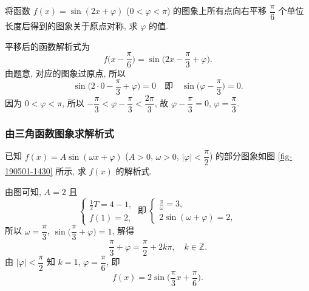 \begin{exercise}
    将函数 $f(x)=\sin(2x+\varphi)$ ($0<\varphi<\pi$) 的图象上所有点向右平移 $\dfrac\pi6$ 个单位长度后得到的图象关于原点对称, 求 $\varphi$ 的值.
\end{exercise}
\beginsolution
    平移后的函数解析式为
    \[f\biggl(x- \frac\pi6\biggr)= \sin\biggl(2x-\frac\pi3+\varphi\biggr).\]
    由题意, 对应的图象过原点, 所以
    \[\sin\biggl(2\cdot 0-\frac\pi3+\varphi\biggr)=0\quad
        \text{即}\quad\sin\biggl(\varphi- \frac\pi3\biggr)=0.\]
    因为 $0<\varphi<\pi$, 所以 $-\dfrac\pi3< \varphi-\dfrac\pi3< \dfrac{2\pi}3$, 故 $\varphi- \dfrac\pi3=0$, $\varphi= \dfrac\pi3$.
\endsolution

\subsubsection{由三角函数图象求解析式}

\begin{example}
    已知 $f(x)=A\sin(\omega x+\varphi)$ ($A>0$, $\omega>0$, $|\varphi|< \dfrac\pi2$) 的部分图象如图 \ref{fig-190501-1430} 所示, 求 $f(x)$ 的解析式.
\end{example}
\beginsolution
    由图可知, $A=2$ 且
    \[\left\{\!\!\begin{array}{l}
        \frac12 T= 4-1,\\
        f(1)=2,
    \end{array}\right.\ \text{即}\ 
    \left\{\!\!\begin{array}{l}
        \frac\pi\omega= 3,\\
        2\sin(\omega+\varphi)= 2,
    \end{array}\right.\]
    所以 $\omega= \dfrac\pi3$, $\sin\biggl(\dfrac\pi3+ \varphi\biggr)= 1$, 解得
    \[\frac\pi3+\varphi= \frac\pi2+2k\pi,\quad k\in\mathbb{Z}.\]
    由 $|\varphi|< \dfrac\pi2$ 知 $k=1$, $\varphi= \dfrac\pi6$, 即
    \[f(x)= 2\sin\biggl(\frac\pi3 x+ \frac\pi6\biggr).\]
\endsolution


